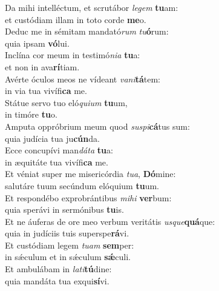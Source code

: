 \evenverse Da mihi intelléctum, et scrutábor \textit{le}\textit{gem} \textbf{tu}am:~\*\\
\evenverse et custódiam illam in toto corde \textbf{me}o.\\
\oddverse Deduc me in sémitam mandató\textit{rum} \textit{tu}\textbf{ó}rum:~\*\\
\oddverse quia ipsam \textbf{vó}lui.\\
\evenverse Inclína cor meum in testimó\textit{ni}\textit{a} \textbf{tu}a:~\*\\
\evenverse et non in ava\textbf{rí}tiam.\\
\oddverse Avérte óculos meos ne vídeant \textit{va}\textit{ni}\textbf{tá}tem:~\*\\
\oddverse in via tua vivífi\textbf{ca} me.\\
\evenverse Státue servo tuo eló\textit{qui}\textit{um} \textbf{tu}um,~\*\\
\evenverse in timóre \textbf{tu}o.\\
\oddverse Amputa oppróbrium meum quod \textit{su}\textit{spi}\textbf{cá}tus sum:~\*\\
\oddverse quia judícia tua ju\textbf{cún}da.\\
\evenverse Ecce concupívi man\textit{dá}\textit{ta} \textbf{tu}a:~\*\\
\evenverse in æquitáte tua vivífi\textbf{ca} me.\\
\oddverse Et véniat super me misericórdia \textit{tu}\textit{a}, \textbf{Dó}mine:~\*\\
\oddverse salutáre tuum secúndum elóquium \textbf{tu}um.\\
\evenverse Et respondébo exprobrántibus \textit{mi}\textit{hi} \textbf{ver}bum:~\*\\
\evenverse quia sperávi in sermónibus \textbf{tu}is.\\
\oddverse Et ne áuferas de ore meo verbum veritátis \textit{us}\textit{que}\textbf{quá}que:~\*\\
\oddverse quia in judíciis tuis superspe\textbf{rá}vi.\\
\evenverse Et custódiam legem \textit{tu}\textit{am} \textbf{sem}per:~\*\\
\evenverse in sǽculum et in sǽculum \textbf{sǽ}culi.\\
\oddverse Et ambulábam in \textit{la}\textit{ti}\textbf{tú}dine:~\*\\
\oddverse quia mandáta tua exqui\textbf{sí}vi.\\
